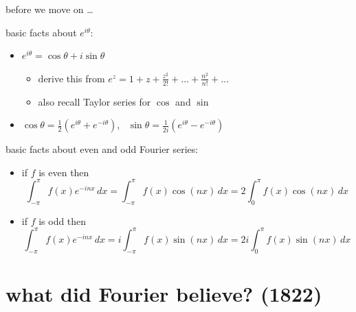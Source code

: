 \documentclass[10pt,
               svgnames,
               hyperref={colorlinks,
                         citecolor=DeepPink4,
                         linkcolor=FireBrick,
                         urlcolor=blue},
               usepdftitle=false]{beamer}
\newcommand{\ds}{\displaystyle}
\begin{document}
\begin{frame}{before we move on \dots}


\begin{block}{basic facts about $e^{i\theta}$:}
\begin{itemize}
\item $\ds e^{i\theta}=\cos\theta + i \sin\theta$
    \begin{itemize}
    \item[$\circ$] derive this from $e^z = 1 + z + \frac{z^2}{2!} + \dots + \frac{n^2}{n!} + \dots$
    \item[$\circ$] also recall Taylor series for $\cos$ and $\sin$
    \end{itemize}
\item $\ds \cos\theta = \frac{1}{2}\left(e^{i\theta}+e^{-i\theta}\right)$, \, $\ds \sin\theta = \frac{1}{2i}\left(e^{i\theta}-e^{-i\theta}\right)$
\end{itemize}
\end{block}

\medskip

\begin{block}{basic facts about even and odd Fourier series:}
\begin{itemize}
\item if $f$ is even then
    $$\int_{-\pi}^\pi f(x) e^{-inx}\,dx=\int_{-\pi}^\pi f(x) \cos(nx)\,dx=2\int_0^\pi f(x) \cos(nx)\,dx$$
\item if $f$ is odd then
    $$\int_{-\pi}^\pi f(x) e^{-inx}\,dx=i\int_{-\pi}^\pi f(x) \sin(nx)\,dx=2i\int_0^\pi f(x) \sin(nx)\,dx$$
\end{itemize}
\end{block}
\end{frame}


\AtBeginSection[] {
    \begin{frame}{Outline}
    \setbeamertemplate{section in toc}[sections numbered]
    \tableofcontents[currentsection]%
    \end{frame}
}


\section{what did Fourier believe? (1822)}
\end{document}
